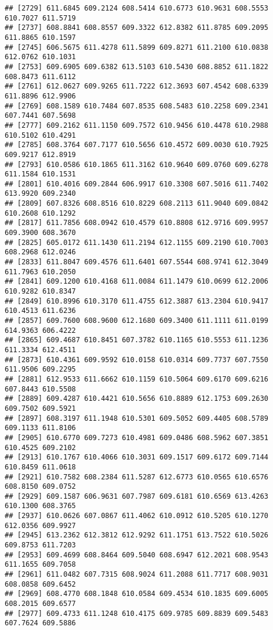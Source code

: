 \documentclass[
]{article}
\begin{document}
\begin{verbatim}
## [2729] 611.6845 609.2124 608.5414 610.6773 610.9631 608.5553 610.7027 611.5719
## [2737] 608.8841 608.8557 609.3322 612.8382 611.8785 609.2095 611.8865 610.1597
## [2745] 606.5675 611.4278 611.5899 609.8271 611.2100 610.0838 612.0762 610.1031
## [2753] 609.6905 609.6382 613.5103 610.5430 608.8852 611.1822 608.8473 611.6112
## [2761] 612.0627 609.9265 611.7222 612.3693 607.4542 608.6339 611.8896 612.9906
## [2769] 608.1589 610.7484 607.8535 608.5483 610.2258 609.2341 607.7441 607.5698
## [2777] 609.2162 611.1150 609.7572 610.9456 610.4478 610.2988 610.5102 610.4291
## [2785] 608.3764 607.7177 610.5656 610.4572 609.0030 610.7925 609.9217 612.8919
## [2793] 610.0586 610.1865 611.3162 610.9640 609.0760 609.6278 611.1584 610.1531
## [2801] 610.4016 609.2844 606.9917 610.3308 607.5016 611.7402 613.9920 609.2340
## [2809] 607.8326 608.8516 610.8229 608.2113 611.9040 609.0842 610.2608 610.1292
## [2817] 611.7856 608.0942 610.4579 610.8808 612.9716 609.9957 609.3900 608.3670
## [2825] 605.0172 611.1430 611.2194 612.1155 609.2190 610.7003 608.2968 612.0246
## [2833] 611.8047 609.4576 611.6401 607.5544 608.9741 612.3049 611.7963 610.2050
## [2841] 609.1200 610.4168 611.0084 611.1479 610.0699 612.2006 610.9282 610.8347
## [2849] 610.8996 610.3170 611.4755 612.3887 613.2304 610.9417 610.4513 611.6236
## [2857] 609.7600 608.9600 612.1680 609.3400 611.1111 611.0199 614.9363 606.4222
## [2865] 609.4687 610.8451 607.3782 610.1165 610.5553 611.1236 611.3334 612.4511
## [2873] 610.4361 609.9592 610.0158 610.0314 609.7737 607.7550 611.9506 609.2295
## [2881] 612.9533 611.6662 610.1159 610.5064 609.6170 609.6216 607.8443 610.5508
## [2889] 609.4287 610.4421 610.5656 610.8889 612.1753 609.2630 609.7502 609.5921
## [2897] 608.3197 611.1948 610.5301 609.5052 609.4405 608.5789 609.1133 611.8106
## [2905] 610.6770 609.7273 610.4981 609.0486 608.5962 607.3851 610.4525 609.2102
## [2913] 610.1767 610.4066 610.3031 609.1517 609.6172 609.7144 610.8459 611.0618
## [2921] 610.7582 608.2384 611.5287 612.6773 610.0565 610.6576 608.8150 609.0752
## [2929] 609.1587 606.9631 607.7987 609.6181 610.6569 613.4263 610.1300 608.3765
## [2937] 610.0626 607.0867 611.4062 610.0912 610.5205 610.1270 612.0356 609.9927
## [2945] 613.2362 612.3812 612.9292 611.1751 613.7522 610.5026 609.8753 611.7203
## [2953] 609.4699 608.8464 609.5040 608.6947 612.2021 608.9543 611.1655 609.7058
## [2961] 611.0482 607.7315 608.9024 611.2088 611.7717 608.9031 608.0858 609.6452
## [2969] 608.4770 608.1848 610.0584 609.4534 610.1835 609.6005 608.2015 609.6577
## [2977] 609.4733 611.1248 610.4175 609.9785 609.8839 609.5483 607.7624 609.5886

\end{verbatim}
\end{document}
